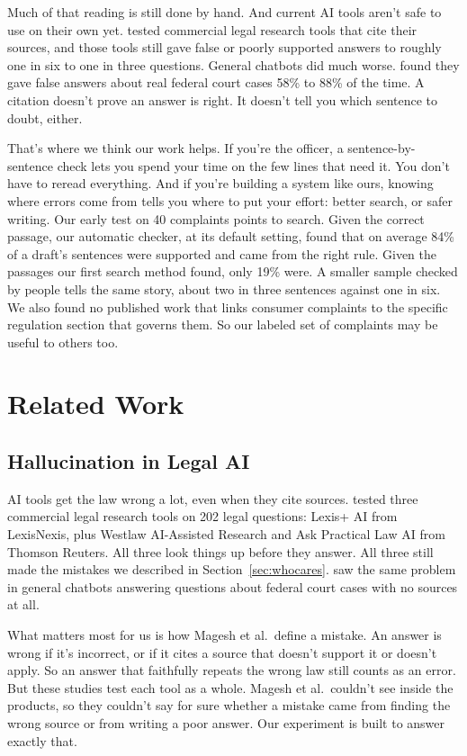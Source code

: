 \documentclass[10pt]{article}
\begin{document}
Much of that reading is still done by hand. And current AI tools aren't safe to
use on their own yet. \citet{magesh2025hallucination} tested
commercial legal research tools that cite their sources, and those tools still
gave false or poorly supported answers to roughly one in six to one in three
questions. General chatbots did much worse.
\citet{dahl2024legalfictions} found they gave false answers about real
federal court cases 58\% to 88\% of the time. A citation doesn't prove an answer
is right. It doesn't tell you which sentence to doubt, either.

That's where we think our work helps. If you're the officer, a
sentence-by-sentence check lets you spend your time on the few lines that need
it. You don't have to reread everything. And if you're building a system like
ours, knowing where errors come from tells you where to put your effort: better
search, or safer writing. Our early test on 40 complaints points to search.
Given the correct passage, our automatic checker, at its default setting, found
that on average 84\% of a draft's sentences were supported and came from the
right rule. Given the passages our first search method found, only 19\% were. A
smaller sample checked by people tells the same story, about two in three
sentences against one in six. We also found no published work that links
consumer complaints to the specific regulation section that governs them. So
our labeled set of complaints may be useful to others too.

\section{Related Work}

\subsection{Hallucination in Legal AI}
AI tools get the law wrong a lot, even when they cite sources.
\citet{magesh2025hallucination} tested three commercial legal research
tools on 202 legal questions: Lexis+ AI from LexisNexis, plus Westlaw
AI-Assisted Research and Ask Practical Law AI from Thomson Reuters. All three
look things up before they answer. All three still made the mistakes we
described in Section~\ref{sec:whocares}. \citet{dahl2024legalfictions}
saw the same problem in general chatbots answering questions about federal court
cases with no sources at all.

What matters most for us is how Magesh et al.\ define a mistake. An answer is
wrong if it's incorrect, or if it cites a source that doesn't support it or
doesn't apply. So an answer that faithfully repeats the wrong law still counts as
an error. But these studies test each tool as a whole. Magesh et al.\ couldn't
see inside the products, so they couldn't say for sure whether a mistake came
from finding the wrong source or from writing a poor answer. Our experiment is
built to answer exactly that.
\end{document}
